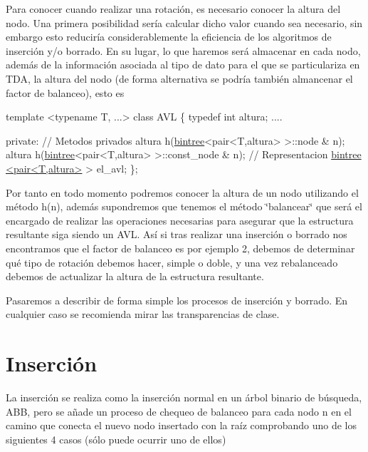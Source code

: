 Para conocer cuando realizar una rotación, es necesario conocer la altura del nodo. Una primera posibilidad sería calcular dicho valor cuando sea necesario, sin embargo esto reduciría considerablemente la eficiencia de los algoritmos de inserción y/o borrado. En su lugar, lo que haremos será almacenar en cada nodo, además de la información asociada al tipo de dato para el que se particulariza en T\+D\+A, la altura del nodo (de forma alternativa se podría también almancenar el factor de balanceo), esto es


\begin{DoxyCode}
\textcolor{keyword}{template} <\textcolor{keyword}{typename} T, ...>
\textcolor{keyword}{class }AVL \{
\textcolor{keyword}{typedef} \textcolor{keywordtype}{int} altura;
....

\textcolor{keyword}{private}:
  \textcolor{comment}{// Metodos privados}
   altura h(\hyperlink{classbintree}{bintree}<pair<T,altura> >::node & n);
   altura h(\hyperlink{classbintree}{bintree}<pair<T,altura> >::const\_node & n);
 \textcolor{comment}{// Representacion}
  \hyperlink{classbintree}{bintree <pair<T,altura>} > el\_avl;
\};
\end{DoxyCode}


Por tanto en todo momento podremos conocer la altura de un nodo utilizando el método h(n), además supondremos que tenemos el método \char`\"{}balancear\char`\"{} que será el encargado de realizar las operaciones necesarias para asegurar que la estructura resultante siga siendo un A\+V\+L. Así si tras realizar una inserción o borrado nos encontramos que el factor de balanceo es por ejemplo 2, debemos de determinar qué tipo de rotación debemos hacer, simple o doble, y una vez rebalanceado debemos de actualizar la altura de la estructura resultante.

Pasaremos a describir de forma simple los procesos de inserción y borrado. En cualquier caso se recomienda mirar las transparencias de clase.\hypertarget{index_Insercion}{}\section{Inserción}\label{index_Insercion}
La inserción se realiza como la inserción normal en un árbol binario de búsqueda, A\+B\+B, pero se añade un proceso de chequeo de balanceo para cada nodo n en el camino que conecta el nuevo nodo insertado con la raíz comprobando uno de los siguientes 4 casos (sólo puede ocurrir uno de ellos)

